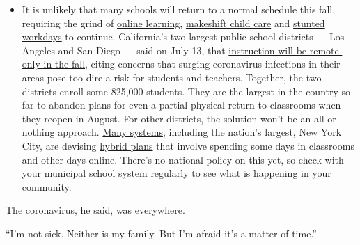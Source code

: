 \begin{itemize}
  \begin{itemize}
  \tightlist
  \item
    It is unlikely that many schools will return to a normal schedule
    this fall, requiring the grind of
    \href{https://www.nytimes3xbfgragh.onion/2020/06/05/us/coronavirus-education-lost-learning.html?action=click\&pgtype=Article\&state=default\&region=MAIN_CONTENT_3\&context=storylines_faq}{online
    learning},
    \href{https://www.nytimes3xbfgragh.onion/2020/05/29/us/coronavirus-child-care-centers.html?action=click\&pgtype=Article\&state=default\&region=MAIN_CONTENT_3\&context=storylines_faq}{makeshift
    child care} and
    \href{https://www.nytimes3xbfgragh.onion/2020/06/03/business/economy/coronavirus-working-women.html?action=click\&pgtype=Article\&state=default\&region=MAIN_CONTENT_3\&context=storylines_faq}{stunted
    workdays} to continue. California's two largest public school
    districts --- Los Angeles and San Diego --- said on July 13, that
    \href{https://www.nytimes3xbfgragh.onion/2020/07/13/us/lausd-san-diego-school-reopening.html?action=click\&pgtype=Article\&state=default\&region=MAIN_CONTENT_3\&context=storylines_faq}{instruction
    will be remote-only in the fall}, citing concerns that surging
    coronavirus infections in their areas pose too dire a risk for
    students and teachers. Together, the two districts enroll some
    825,000 students. They are the largest in the country so far to
    abandon plans for even a partial physical return to classrooms when
    they reopen in August. For other districts, the solution won't be an
    all-or-nothing approach.
    \href{https://bioethics.jhu.edu/research-and-outreach/projects/eschool-initiative/school-policy-tracker/}{Many
    systems}, including the nation's largest, New York City, are
    devising
    \href{https://www.nytimes3xbfgragh.onion/2020/06/26/us/coronavirus-schools-reopen-fall.html?action=click\&pgtype=Article\&state=default\&region=MAIN_CONTENT_3\&context=storylines_faq}{hybrid
    plans} that involve spending some days in classrooms and other days
    online. There's no national policy on this yet, so check with your
    municipal school system regularly to see what is happening in your
    community.
  \end{itemize}
\end{itemize}

The coronavirus, he said, was everywhere.

``I'm not sick. Neither is my family. But I'm afraid it's a matter of
time.''

